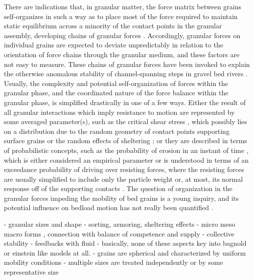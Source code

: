 \documentclass{article}
\begin{document}
There are indications that, in granular matter, the force matrix between grains self-organizes in such a way as to place most of the force required to maintain static equilibrium across a minority of the contact points in the granular assembly, developing chains of granular forces \citep{Peters2005, Corwin2005, Liu2010}. 
Accordingly, granular forces on individual grains are expected to deviate unpredictably in relation to the orientation of force chains through the granular medium, and these factors are not easy to measure. 
These chains of granular forces have been invoked to explain the otherwise anomalous stability of channel-spanning steps in gravel bed rivers \citep{Zimmerman2010, Saletti2016}. 
Usually, the complexity and potential self-organization of forces within the granular phase, and the coordinated nature of the force balance within the granular phase, is simplified drastically in one of a few ways. 
Either the result of all granular interactions which imply resistance to motion are represented by some averaged parameter(s), such as the critical shear stress \citep{Shields1936, Montgomery1997}, which possibly lies on a distribution due to the random geometry of contact points supporting surface grains or the random effects of sheltering \citep{Wiberg1987, Bridge1992, Ferreira2015}; or they are described in terms of probabilistic concepts, such as the probability of erosion in an instant of time \citep{Einstein1950}, which is either considered an empirical parameter \citep{Ancey2008} or is understood in terms of an exceedance probability of driving over resisting forces, where the resisting forces are usually simplified to include only the particle weight \citep{Einstein1950} or, at most, its normal response off of the supporting contacts \citep{Paintal1971, Dey2018}.
The question of organization in the granular forces impeding the mobility of bed grains is a young inquiry, and its potential influence on bedload motion has not really been quantified \citep{}.  

- granular sizes and shape
- sorting, armoring, sheltering effects
- micro meso macro forms , connection with balance of competence and supply 
- collective stability 
- feedbacks with fluid
- basically, none of these aspects key into bagnold or einstein like models at all. 
- grains are spherical and characterized by uniform mobility conditions
- multiple sizes are treated independently or by some representative size
\end{document}
